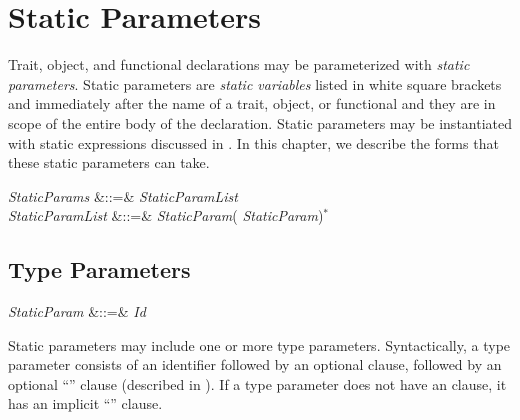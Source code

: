 %
%
%
%

\chapter{Static Parameters}


Trait, object, and functional declarations may be
parameterized with \emph{static parameters}.
Static parameters are \emph{static variables} listed in white
square brackets \EXP{\llbracket} and \EXP{\rrbracket}
immediately after the name of a trait, object, or functional and
they are in scope of the entire body of the declaration.
Static parameters may be instantiated with static expressions discussed in
.
In this chapter, we describe the forms that
these static parameters can take.

\begin{Grammar}
\emph{StaticParams} &::=&
\bTPl \emph{StaticParamList}\bTPr\\
\emph{StaticParamList} &::=& \emph{StaticParam}(\EXP{,} \emph{StaticParam})$^*$\\
\end{Grammar}

\section{Type Parameters}

\begin{Grammar}
\emph{StaticParam} &::=&
\emph{Id}   \\
\end{Grammar}

Static parameters may include one or more type parameters.
Syntactically, a type parameter consists of an identifier followed by an
optional  clause, followed by an optional
``'' clause (described in
).
If a type parameter does not have an  clause, it has an
implicit ``'' clause.


